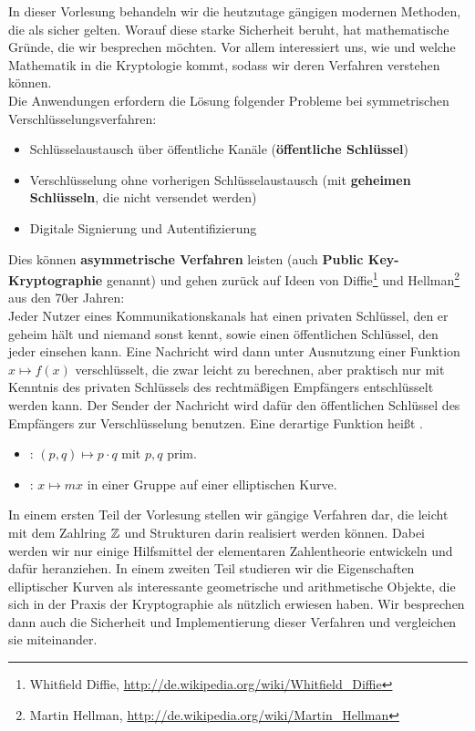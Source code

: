 In dieser Vorlesung behandeln wir die heutzutage gängigen modernen Methoden, die als sicher gelten. Worauf diese starke Sicherheit beruht, hat mathematische Gründe, die wir besprechen möchten. Vor allem interessiert uns, wie und welche Mathematik in die Kryptologie kommt, sodass wir deren Verfahren verstehen können. \\

Die Anwendungen erfordern die Lösung folgender Probleme bei symmetrischen Verschlüsselungsverfahren:
\begin{itemize}
	\item Schlüsselaustausch über öffentliche Kanäle (\textbf{öffentliche Schlüssel})
	\item Verschlüsselung ohne vorherigen Schlüsselaustausch (mit \textbf{geheimen Schlüsseln}, die nicht versendet werden)
	\item Digitale Signierung und Autentifizierung
\end{itemize}
Dies können \textbf{asymmetrische Verfahren} leisten (auch \textbf{Public Key-Kryptographie} genannt) und gehen zurück auf Ideen von Diffie\footnote{Whitfield Diffie, \url{http://de.wikipedia.org/wiki/Whitfield_Diffie}} und Hellman\footnote{Martin Hellman, \url{http://de.wikipedia.org/wiki/Martin_Hellman}} aus den 70er Jahren: \\

Jeder Nutzer eines Kommunikationskanals hat einen privaten Schlüssel, den er geheim hält und niemand sonst kennt, sowie einen öffentlichen Schlüssel, den jeder einsehen kann. Eine Nachricht wird dann unter Ausnutzung einer Funktion $x \mapsto f(x)$ verschlüsselt, die zwar leicht zu berechnen, aber praktisch nur mit Kenntnis des privaten Schlüssels des rechtmäßigen Empfängers entschlüsselt werden kann. Der Sender der Nachricht wird dafür den öffentlichen Schlüssel des Empfängers zur Verschlüsselung benutzen. Eine derartige Funktion heißt .

\begin{itemize}
	\item {}: $(p,q) \mapsto p \cdot q$ mit $p,q$ prim.
	\item {}: $x \mapsto mx$ in einer Gruppe auf einer elliptischen Kurve.
\end{itemize}

In einem ersten Teil der Vorlesung stellen wir gängige Verfahren dar, die leicht mit dem Zahlring $\mathbb{Z}$ und Strukturen darin realisiert werden können. Dabei werden wir nur einige Hilfsmittel der elementaren Zahlentheorie entwickeln und dafür heranziehen. In einem zweiten Teil studieren wir die Eigenschaften elliptischer Kurven als interessante geometrische und arithmetische Objekte, die sich in der Praxis der Kryptographie als nützlich erwiesen haben. Wir besprechen dann auch die Sicherheit und Implementierung dieser Verfahren und vergleichen sie miteinander.

